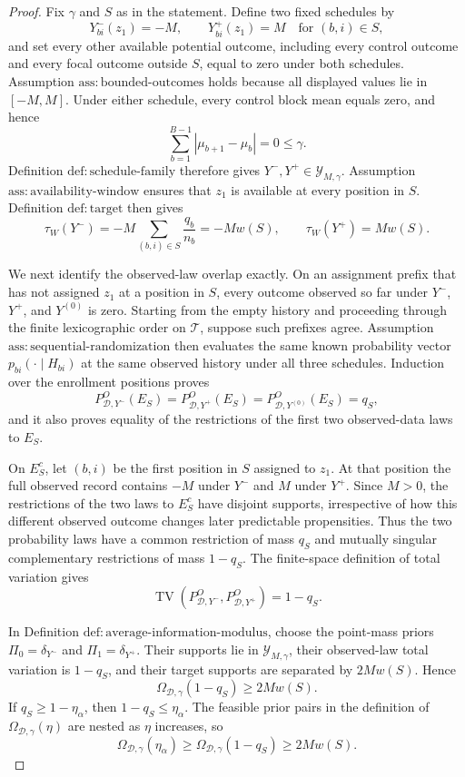 \documentclass{article}
\begin{document}
\begin{proof}
Fix \(\gamma\) and \(S\) as in the statement.  Define two fixed schedules by
\[
 Y^-_{bi}(z_1)=-M,
 \qquad
 Y^+_{bi}(z_1)=M
 \quad\text{for }(b,i)\in S,
\]
and set every other available potential outcome, including every control outcome and every focal outcome outside \(S\), equal to zero under both schedules.  Assumption \(\mathrm{ass:bounded\text{-}outcomes}\) holds because all displayed values lie in \([-M,M]\).  Under either schedule, every control block mean equals zero, and hence
\[
 \sum_{b=1}^{B-1}|\mu_{b+1}-\mu_b|=0\le\gamma.
\]
Definition \(\mathrm{def:schedule\text{-}family}\) therefore gives \(Y^-,Y^+\in\mathcal Y_{M,\gamma}\).  Assumption \(\mathrm{ass:availability\text{-}window}\) ensures that \(z_1\) is available at every position in \(S\).  Definition \(\mathrm{def:target}\) then gives
\[
 \tau_W(Y^-)=-M\sum_{(b,i)\in S}\frac{q_b}{n_b}=-Mw(S),
 \qquad
 \tau_W(Y^+)=Mw(S).
\]

We next identify the observed-law overlap exactly.  On an assignment prefix that has not assigned \(z_1\) at a position in \(S\), every outcome observed so far under \(Y^-\), \(Y^+\), and \(Y^{(0)}\) is zero.  Starting from the empty history and proceeding through the finite lexicographic order on \(\mathcal T\), suppose such prefixes agree.  Assumption \(\mathrm{ass:sequential\text{-}randomization}\) then evaluates the same known probability vector \(p_{bi}(\cdot\mid H_{bi})\) at the same observed history under all three schedules.  Induction over the enrollment positions proves
\[
 P^O_{\mathcal D,Y^-}(E_S)
 =P^O_{\mathcal D,Y^+}(E_S)
 =P^O_{\mathcal D,Y^{(0)}}(E_S)=q_S,
\]
and it also proves equality of the restrictions of the first two observed-data laws to \(E_S\).

On \(E_S^c\), let \((b,i)\) be the first position in \(S\) assigned to \(z_1\).  At that position the full observed record contains \(-M\) under \(Y^-\) and \(M\) under \(Y^+\).  Since \(M>0\), the restrictions of the two laws to \(E_S^c\) have disjoint supports, irrespective of how this different observed outcome changes later predictable propensities.  Thus the two probability laws have a common restriction of mass \(q_S\) and mutually singular complementary restrictions of mass \(1-q_S\).  The finite-space definition of total variation gives
\[
 \operatorname{TV}\!\left(P^O_{\mathcal D,Y^-},P^O_{\mathcal D,Y^+}\right)=1-q_S.
\]

In Definition \(\mathrm{def:average\text{-}information\text{-}modulus}\), choose the point-mass priors \(\Pi_0=\delta_{Y^-}\) and \(\Pi_1=\delta_{Y^+}\).  Their supports lie in \(\mathcal Y_{M,\gamma}\), their observed-law total variation is \(1-q_S\), and their target supports are separated by \(2Mw(S)\).  Hence
\[
 \Omega_{\mathcal D,\gamma}(1-q_S)\ge2Mw(S).
\]
If \(q_S\ge1-\eta_\alpha\), then \(1-q_S\le\eta_\alpha\).  The feasible prior pairs in the definition of \(\Omega_{\mathcal D,\gamma}(\eta)\) are nested as \(\eta\) increases, so
\[
 \Omega_{\mathcal D,\gamma}(\eta_\alpha)
 \ge\Omega_{\mathcal D,\gamma}(1-q_S)
 \ge2Mw(S).
\]


\end{proof}
\end{document}
